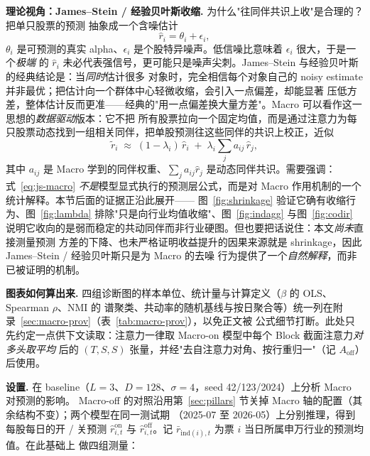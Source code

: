 \documentclass[a4paper,11pt,fontset=fandol]{ctexart}
\begin{document}
\textbf{\heiti 理论视角：James--Stein / 经验贝叶斯收缩.} 为什么"往同伴共识上收"是合理的？把单只股票的预测
抽象成一个含噪估计
\begin{equation}\label{eq:js}
\hat r_i = \theta_i + \epsilon_i,
\end{equation}
$\theta_i$ 是可预测的真实 alpha、$\epsilon_i$ 是个股特异噪声。低信噪比意味着 $\epsilon_i$ 很大，于是一个\emph{极端}
的 $\hat r_i$ 未必代表强信号，更可能只是噪声尖刺。James--Stein 与经验贝叶斯的经典结论是：当\emph{同时}估计很多
对象时，完全相信每个对象自己的 noisy estimate 并非最优；把估计向一个群体中心轻微收缩，会引入一点偏差，却能显著
压低方差，整体估计反而更准——经典的"用一点偏差换大量方差"。Macro 可以看作这一思想的\emph{数据驱动}版本：它不把
所有股票拉向一个固定均值，而是通过注意力为每只股票动态找到一组相关同伴，把单股预测往这些同伴的共识上校正，近似
\begin{equation}\label{eq:js-macro}
\tilde r_i \;\approx\; (1-\lambda_i)\,\hat r_i \;+\; \lambda_i \sum_j a_{ij}\,\hat r_j,
\end{equation}
其中 $a_{ij}$ 是 Macro 学到的同伴权重、$\sum_j a_{ij}\hat r_j$ 是动态同伴共识。需要强调：式~\eqref{eq:js-macro}
\emph{不是}模型显式执行的预测层公式，而是对 Macro 作用机制的一个统计解释。本节后面的证据正沿此展开——
图~\ref{fig:shrinkage} 验证它确有收缩行为、图~\ref{fig:lambda} 排除"只是向行业均值收缩"、图~\ref{fig:indagg}
与图~\ref{fig:codir} 说明它收向的是弱而稳定的共动同伴而非行业硬图。但也要把话说住：本文\emph{尚未}直接测量预测
方差的下降、也未严格证明收益提升的因果来源就是 shrinkage，因此 James--Stein / 经验贝叶斯只是为 Macro 的去噪
行为提供了一个\emph{自然解释}，而非已被证明的机制。

\textbf{\heiti 图表如何算出来.} 四组诊断图的样本单位、统计量与计算定义（$\beta$ 的 OLS、Spearman $\rho$、NMI 的
谱聚类、共动率的随机基线与按日聚合等）统一列在附录~\ref{sec:macro-prov}（表~\ref{tab:macro-prov}），以免正文被
公式细节打断。此处只先约定一点供下文读取：注意力一律取 Macro-on 模型中每个 Block 截面注意力\emph{对多头取平均}
后的 $(T,S,S)$ 张量，并经"去自注意力对角、按行重归一"（记 $A_{\mathrm{off}}$）后使用。

\textbf{\heiti 设置.} 在 baseline（$L{=}3$、$D{=}128$、$\sigma{=}4$，seed 42/123/2024）上分析 Macro 对预测的影响。
Macro-off 的对照沿用第~\ref{sec:pillars} 节关掉 Macro 轴的配置（其余结构不变）；两个模型在同一测试期
（2025-07 至 2026-05）上分别推理，得到每股每日的开 / 关预测 $\hat r^{\mathrm{on}}_{i,t}$ 与
$\hat r^{\mathrm{off}}_{i,t}$。记 $\bar r_{\mathrm{ind}(i),t}$ 为票 $i$ 当日所属申万行业的预测均值。在此基础上
做四组测量：
\end{document}
